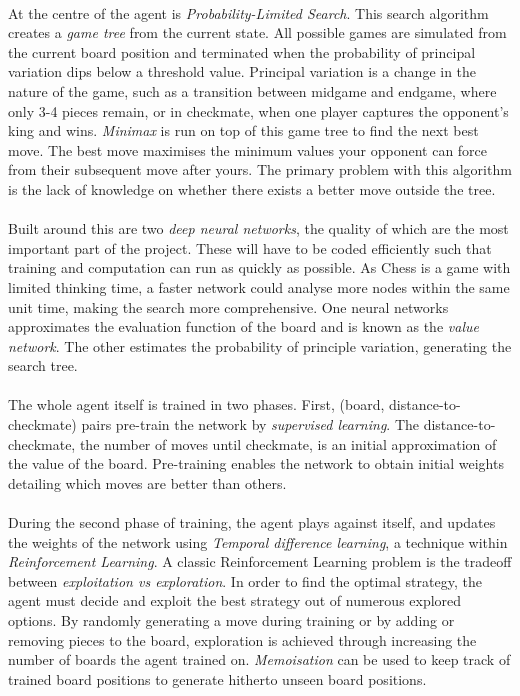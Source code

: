 \documentclass[a4paper]{article}
\begin{document}
\paragraph{}At the centre of the agent is \textit{Probability-Limited Search}. This search algorithm creates a \textit{game tree} from the current state. All possible games are simulated from the current board position and terminated when the probability of principal variation dips below a threshold value. Principal variation is a change in the nature of the game, such as a transition between midgame and endgame, where only 3-4 pieces remain, or in checkmate, when one player captures the opponent's king and wins. \textit{Minimax} is run on top of this game tree to find the next best move. The best move maximises the minimum values your opponent can force from their subsequent move after yours. The primary problem with this algorithm is the lack of knowledge on whether there exists a better move outside the tree.

\paragraph{}Built around this are two \textit{deep neural networks}, the quality of which are the most important part of the project. These will have to be coded efficiently such that training and computation can run as quickly as possible. As Chess is a game with limited thinking time, a faster network could analyse more nodes within the same unit time, making the search more comprehensive. One neural networks approximates the evaluation function of the board and is known as the \textit{value network}. The other estimates the probability of principle variation, generating the search tree.

\paragraph{}The whole agent itself is trained in two phases. First, (board, distance-to-checkmate) pairs pre-train the network by \textit{supervised learning}. The distance-to-checkmate, the number of moves until checkmate, is an initial approximation of the value of the board. Pre-training enables the network to obtain initial weights detailing which moves are better than others.

\paragraph{}During the second phase of training, the agent plays against itself, and updates the weights of the network using \textit{Temporal difference learning}, a technique within \textit{Reinforcement Learning}. A classic Reinforcement Learning problem is the tradeoff between \textit{exploitation vs exploration}. In order to find the optimal strategy, the agent must decide and exploit the best strategy out of numerous explored options. By randomly generating a move during training or by adding or removing pieces to the board, exploration is achieved through increasing the number of boards the agent trained on. \textit{Memoisation} can be used to keep track of trained board positions to generate hitherto unseen board positions. \cite{giraffe}
\end{document}
